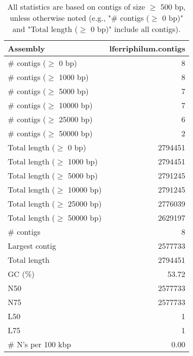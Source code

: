 \documentclass[12pt,a4paper]{article}
\begin{document}
\begin{table}[ht]
\begin{center}
\caption{All statistics are based on contigs of size $\geq$ 500 bp, unless otherwise noted (e.g., "\# contigs ($\geq$ 0 bp)" and "Total length ($\geq$ 0 bp)" include all contigs).}
\begin{tabular}{|l*{1}{|r}|}
\hline
Assembly & lferriphilum.contigs \\ \hline
\# contigs ($\geq$ 0 bp) & 8 \\ \hline
\# contigs ($\geq$ 1000 bp) & 8 \\ \hline
\# contigs ($\geq$ 5000 bp) & 7 \\ \hline
\# contigs ($\geq$ 10000 bp) & 7 \\ \hline
\# contigs ($\geq$ 25000 bp) & 6 \\ \hline
\# contigs ($\geq$ 50000 bp) & 2 \\ \hline
Total length ($\geq$ 0 bp) & 2794451 \\ \hline
Total length ($\geq$ 1000 bp) & 2794451 \\ \hline
Total length ($\geq$ 5000 bp) & 2791245 \\ \hline
Total length ($\geq$ 10000 bp) & 2791245 \\ \hline
Total length ($\geq$ 25000 bp) & 2776039 \\ \hline
Total length ($\geq$ 50000 bp) & 2629197 \\ \hline
\# contigs & 8 \\ \hline
Largest contig & 2577733 \\ \hline
Total length & 2794451 \\ \hline
GC (\%) & 53.72 \\ \hline
N50 & 2577733 \\ \hline
N75 & 2577733 \\ \hline
L50 & 1 \\ \hline
L75 & 1 \\ \hline
\# N's per 100 kbp & 0.00 \\ \hline
\end{tabular}
\end{center}
\end{table}
\end{document}
